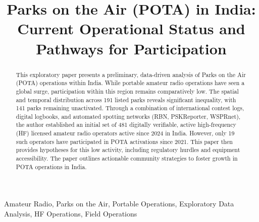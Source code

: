 \documentclass[conference]{IEEEtran}
\begin{document}
\title{Parks on the Air (POTA) in India: Current Operational Status and Pathways for Participation}

\author{
}

\maketitle
{}
\IEEEpubidadjcol

\begin{abstract}
This exploratory paper presents a preliminary, data-driven analysis of
Parks on the Air (POTA) operations within India. While portable
amateur radio operations have seen a global surge, participation
within this region remains comparatively low. The spatial and temporal
distribution across 191 listed parks reveals significant inequality,
with 141 parks remaining unactivated. Through a combination of
international contest logs, digital logbooks, and automated spotting
networks (RBN, PSKReporter, WSPRnet), the author established an
initial set of 481 digitally verifiable, active high-frequency (HF)
licensed amateur radio operators active since 2024 in India. However,
only 19 such operators have participated in POTA activations since
2021. This paper then provides hypotheses for this low activity,
including regulatory hurdles and equipment accessibility. The paper
outlines actionable community strategies to foster growth in POTA
operations in India.
\end{abstract}

\begin{IEEEkeywords}
Amateur Radio, Parks on the Air, Portable Operations, Exploratory Data
Analysis, HF Operations, Field Operations
\end{IEEEkeywords}
\end{document}
